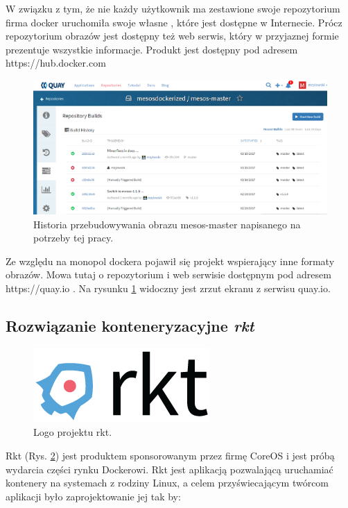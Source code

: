 \documentclass[10pt,a4paper,titlepage,twoside]{report}
\begin{document}
W związku z tym, że nie każdy użytkownik ma zestawione swoje repozytorium firma docker uruchomiła swoje własne \cite{ad28}, które jest dostępne w Internecie. Prócz repozytorium obrazów jest dostępny też web serwis, który w przyjaznej formie prezentuje wszystkie informacje. Produkt jest dostępny pod adresem https://hub.docker.com

\begin{figure}[!h]
	\centering
	\includegraphics[scale=1]{pics/quay.png}
	\caption{Historia przebudowywania obrazu mesos-master napisanego na potrzeby tej pracy.}
	\label{quay_io}
\end{figure}

Ze względu na monopol dockera pojawił się projekt wspierający inne formaty obrazów. Mowa tutaj o repozytorium i web serwisie dostępnym pod adresem https://quay.io \cite{ad28}. Na rysunku \ref{quay_io} widoczny jest zrzut ekranu z serwisu quay.io.

\subsection{Rozwiązanie konteneryzacyjne \textit{rkt}}
\begin{figure}[!h]
	\centering
	\includegraphics[scale=1]{pics/rkt-horizontal-color.png}
	\caption{Logo projektu rkt.}
	\label{rkt_logo}
\end{figure}

Rkt (Rys. \ref{rkt_logo}) jest produktem sponsorowanym przez firmę CoreOS i jest próbą wydarcia części rynku Dockerowi. Rkt jest aplikacją pozwalającą uruchamiać kontenery na systemach z rodziny Linux, a celem przyświecającym twórcom aplikacji było zaprojektowanie jej tak by:
\end{document}
